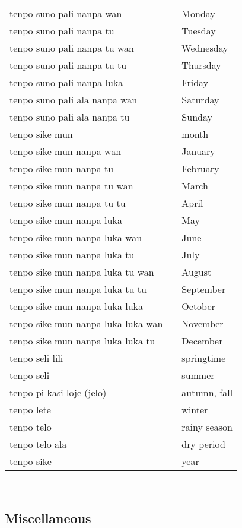 \begin{supertabular}{p{5,5cm}|ll}
tenpo suno pali nanpa wan && Monday \\
tenpo suno pali nanpa tu && Tuesday \\
tenpo suno pali nanpa tu wan && Wednesday \\
tenpo suno pali nanpa tu tu && Thursday \\
tenpo suno pali nanpa luka && Friday \\
tenpo suno pali ala nanpa wan && Saturday \\
tenpo suno pali ala nanpa tu && Sunday \\
%
tenpo sike mun && month \\
tenpo sike mun nanpa wan && January \\
tenpo sike mun nanpa tu && February \\
tenpo sike mun nanpa tu wan &&  March \\
tenpo sike mun nanpa tu tu && April \\
tenpo sike mun nanpa luka &&  May  \\
tenpo sike mun nanpa luka wan && June \\ 
tenpo sike mun nanpa luka tu && July \\
tenpo sike mun nanpa luka tu wan && August \\
tenpo sike mun nanpa luka tu tu && September \\
tenpo sike mun nanpa luka luka && October \\
tenpo sike mun nanpa luka luka wan && November \\
tenpo sike mun nanpa luka luka tu && December \\
%
tenpo seli lili && springtime \\
tenpo seli && summer \\
tenpo pi kasi loje (jelo) && autumn, fall \\
tenpo lete && winter \\
tenpo telo && rainy season \\
tenpo telo ala && dry period \\
tenpo sike && year \\
%
\end{supertabular} \\
%
%
%
%
%
\subsection*{Miscellaneous}
%
%
